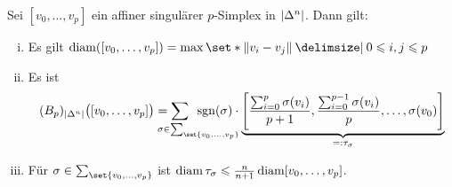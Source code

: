\begin{lemma}[{name=[{Eigenschaften von affinen singulären Simplizes}]},label=lem:1313]
	Sei $[v_0, \ldots , v_p]$ ein affiner singulärer $p$-Simplex in $\abs*{\Delta^n}$. Dann gilt:
	\begin{enumerate}[(i)]
		\item Es gilt $\diam \enbrace*{[v_0, \ldots ,v_p]}= \max \set*{\norm{v_i - v_j} \given 0 \le i,j\le p\rule{0cm}{0.9em}}$
		\item Es ist 
		\[
			(B_p)_{\abs*{\Delta^n}} \enbrace[\big]{[v_0, \ldots ,v_p]} =
			\smashoperator{\sum_{\hspace{3em}\sigma \in \sum_{\set{v_0,\ldots ,v_p}}}}
			\enspace\sgn(\sigma)  \cdot  
			\underbrace{\benbrace*{\frac{\sum_{i=0}^{p} \sigma(v_i)}{p+1}, \frac{\sum_{i=0}^{p-1} \sigma(v_i)}{p} ,\ldots , \sigma(v_0)  } }_{=: \tau_\sigma}
		\]
		\item Für $\sigma \in \sum_{\set{v_0, \ldots ,v_p}}$ ist $\diam \tau_\sigma \le \frac{n}{n+1} \diam [v_0,\ldots ,v_p]$.
	\end{enumerate}
\end{lemma}
